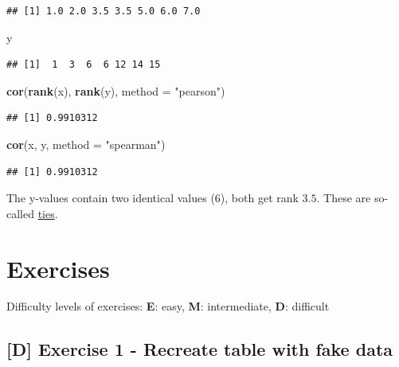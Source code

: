 \documentclass[
]{book}
\newenvironment{Shaded}{\begin{snugshade}}{\end{snugshade}}
\newcommand{\AttributeTok}[1]{\textcolor[rgb]{0.13,0.29,0.53}{#1}}
\newcommand{\FunctionTok}[1]{\textcolor[rgb]{0.13,0.29,0.53}{\textbf{#1}}}
\newcommand{\NormalTok}[1]{#1}
\newcommand{\StringTok}[1]{\textcolor[rgb]{0.31,0.60,0.02}{#1}}
\begin{document}
\begin{verbatim}
## [1] 1.0 2.0 3.5 3.5 5.0 6.0 7.0
\end{verbatim}

\begin{Shaded}
\begin{Highlighting}[]
\NormalTok{y}
\end{Highlighting}
\end{Shaded}

\begin{verbatim}
## [1]  1  3  6  6 12 14 15
\end{verbatim}

\begin{Shaded}
\begin{Highlighting}[]
\FunctionTok{cor}\NormalTok{(}\FunctionTok{rank}\NormalTok{(x), }\FunctionTok{rank}\NormalTok{(y), }\AttributeTok{method =} \StringTok{"pearson"}\NormalTok{)}
\end{Highlighting}
\end{Shaded}

\begin{verbatim}
## [1] 0.9910312
\end{verbatim}

\begin{Shaded}
\begin{Highlighting}[]
\FunctionTok{cor}\NormalTok{(x, y, }\AttributeTok{method =} \StringTok{"spearman"}\NormalTok{)}
\end{Highlighting}
\end{Shaded}

\begin{verbatim}
## [1] 0.9910312
\end{verbatim}

The y-values contain two identical values (\(6\)), both get rank \(3.5\).
These are so-called \href{https://stats.stackexchange.com/questions/7941/what-is-tied-data-in-the-context-of-a-rank-correlation-coefficient}{ties}.

\section{Exercises}\label{exercises-1}

Difficulty levels of exercises:
\textbf{E}: easy,
\textbf{M}: intermediate,
\textbf{D}: difficult

\subsection{{[}D{]} Exercise 1 - Recreate table with fake data}\label{d-exercise-1---recreate-table-with-fake-data}
\end{document}

